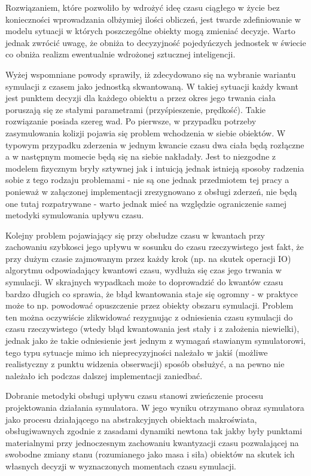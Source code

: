 {{Rozwiązaniem, które pozwoliło by wdrożyć ideę czasu ciągłego w życie bez konieczności wprowadzania olbżymiej ilości obliczeń, jest twarde zdefiniowanie w modelu sytuacji w których poszczególne obiekty mogą zmieniać decyzje. Warto jednak zwrócić uwagę, że obniża to decyzyjność pojedyńczych jednostek w świecie co obniża realizm ewentualnie wdrożonej sztucznej inteligencji.
}
\par{
Wyżej wspomniane powody sprawiły, iż zdecydowano się na wybranie wariantu symulacji z czasem jako jednostką skwantowaną. W takiej sytuacji każdy kwant jest punktem decyzji dla każdego obiektu a przez okres jego trwania ciała poruszają się ze stałymi parametrami (przyśpieszenie, prędkość).
Takie rozwiązanie posiada szereg wad. Po pierwsze, w przypadku potrzeby zasymulowania kolizji pojawia się problem wchodzenia w siebie obiektów. W typowym przypadku zderzenia w jednym kwancie czasu dwa ciała będą rozłączne a w następnym momecie będą się na siebie nakładały. Jest to niezgodne z modelem fizycznym bryły sztywnej jak i intuicją jednak istnieją sposoby radzenia sobie z tego rodzaju problemami - nie są one jednak przedmiotem tej pracy a ponieważ w załączonej implementacji zrezygnowano z obsługi zderzeń, nie będą one tutaj rozpatrywane - warto jednak mieć na względzie ograniczenie samej metodyki symulowania upływu czasu.
}
\par{
Kolejny problem pojawiający się przy obsłudze czasu w kwantach przy zachowaniu szybkosci jego upływu w sosunku do czasu rzeczywistego jest fakt, że przy dużym czasie zajmowanym przez każdy krok (np. na skutek operacji IO) algorytmu odpowiadający kwantowi czasu, wydłuża się czas jego trwania w symulacji. W skrajnych wypadkach może to doprowadzić do kwantów czasu bardzo długich co sprawia, że błąd kwantowania staje się ogromny - w praktyce może to np. powodować opuszczenie przez obiekty obszaru symulacji.
Problem ten można oczywiście zlikwidować rezygnując z odniesienia czasu symulacji do czasu rzeczywistego (wtedy błąd kwantowania jest stały i z założenia niewielki), jednak jako że takie odniesienie jest jednym z wymagań stawianym symulatorowi, tego typu sytuacje mimo ich nieprecyzyjności należało w jakiś (możliwe realistyczny z punktu widzenia obserwacji) sposób obsłużyć, a na pewno nie należało ich podczas dalszej implementacji zaniedbać.
}
\par{
Dobranie metodyki obsługi upływu czasu stanowi zwieńczenie procesu projektowania działania symulatora. W jego wyniku otrzymano obraz symulatora jako procesu działającego na abstrakcyjnych obiektach makroświata, obsługiwawnych zgodnie z zasadami dynamiki newtona tak jakby były punktami materialnymi przy jednoczesnym zachowaniu kwantyzacji czasu pozwalającej na swobodne zmiany stanu (rozumianego jako masa i siła) obiektów na skutek ich własnych decyzji w wyznaczonych momentach czasu symulacji.
}

}
